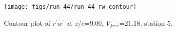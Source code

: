 \begin{figure}[H]
\centering
\texttt{[image: figs/run\_44/run\_44\_rw\_contour]}
\caption{Contour plot of $\overline{r^\prime w^\prime}$ at $z/c$=9.00, $V_{free}$=21.18, station 5.}
\label{fig:run_44_rw_contour}
\end{figure}


